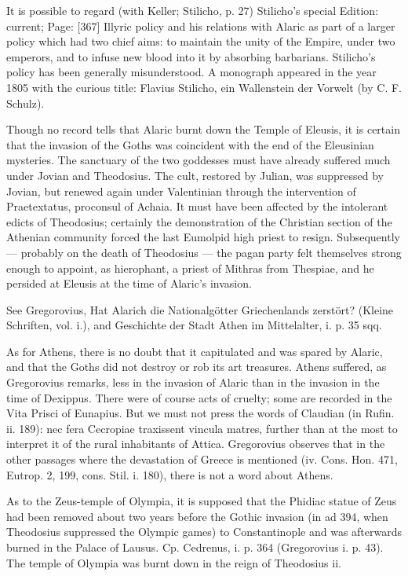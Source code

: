 It is possible to regard (with Keller; Stilicho, p. 27) Stilicho\texthebrew{}’s special Edition: current; Page: [367] Illyric policy and his relations with Alaric as part of a larger policy which had two chief aims: to maintain the unity of the Empire, under two emperors, and to infuse new blood into it by absorbing barbarians. Stilicho\texthebrew{}’s policy has been generally misunderstood. A monograph appeared in the year 1805 with the curious title: Flavius Stilicho, ein Wallenstein der Vorwelt (by C. F. Schulz).


Though no record tells that Alaric burnt down the Temple of Eleusis, it is certain that the invasion of the Goths was coincident with the end of the Eleusinian mysteries. The sanctuary of the two goddesses must have already suffered much under Jovian and Theodosius. The cult, restored by Julian, was suppressed by Jovian, but renewed again under Valentinian through the intervention of Praetextatus, proconsul of Achaia. It must have been affected by the intolerant edicts of Theodosius; certainly the demonstration of the Christian section of the Athenian community forced the last Eumolpid high priest to resign. Subsequently \texthebrew{—} probably on the death of Theodosius \texthebrew{—} the pagan party felt themselves strong enough to appoint, as hierophant, a priest of Mithras from Thespiae, and he persided at Eleusis at the time of Alaric\texthebrew{}’s invasion.

See Gregorovius, Hat Alarich die Nationalgötter Griechenlands zerstört? (Kleine Schriften, vol. i.), and Geschichte der Stadt Athen im Mittelalter, i. p. 35 sqq.

As for Athens, there is no doubt that it capitulated and was spared by Alaric, and that the Goths did not destroy or rob its art treasures. Athens suffered, as Gregorovius remarks, less in the invasion of Alaric than in the invasion in the time of Dexippus. There were of course acts of cruelty; some are recorded in the Vita Prisci of Eunapius. But we must not press the words of Claudian (in Rufin. ii. 189): nec fera Cecropiae traxissent vincula matres, further than at the most to interpret it of the rural inhabitants of Attica. Gregorovius observes that in the other passages where the devastation of Greece is mentioned (iv. Cons. Hon. 471, Eutrop. 2, 199, cons. Stil. i. 180), there is not a word about Athens.

As to the Zeus-temple of Olympia, it is supposed that the Phidiac statue of Zeus had been removed about two years before the Gothic invasion (in ad 394, when Theodosius suppressed the Olympic games) to Constantinople and was afterwards burned in the Palace of Lausus. Cp. Cedrenus, i. p. 364 (Gregorovius i. p. 43). The temple of Olympia was burnt down in the reign of Theodosius ii.

